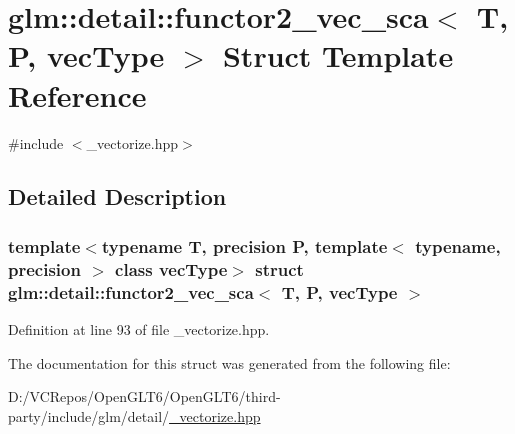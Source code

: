 \hypertarget{structglm_1_1detail_1_1functor2__vec__sca}{}\section{glm\+::detail\+::functor2\+\_\+vec\+\_\+sca$<$ T, P, vec\+Type $>$ Struct Template Reference}
\label{structglm_1_1detail_1_1functor2__vec__sca}


{\ttfamily \#include $<$\+\_\+vectorize.\+hpp$>$}



\subsection{Detailed Description}
\subsubsection*{template$<$typename T, precision P, template$<$ typename, precision $>$ class vec\+Type$>$\newline
struct glm\+::detail\+::functor2\+\_\+vec\+\_\+sca$<$ T, P, vec\+Type $>$}



Definition at line 93 of file \+\_\+vectorize.\+hpp.



The documentation for this struct was generated from the following file\+:\begin{DoxyCompactItemize}
\item 
D\+:/\+V\+C\+Repos/\+Open\+G\+L\+T6/\+Open\+G\+L\+T6/third-\/party/include/glm/detail/\mbox{\hyperlink{__vectorize_8hpp}{\+\_\+vectorize.\+hpp}}\end{DoxyCompactItemize}
